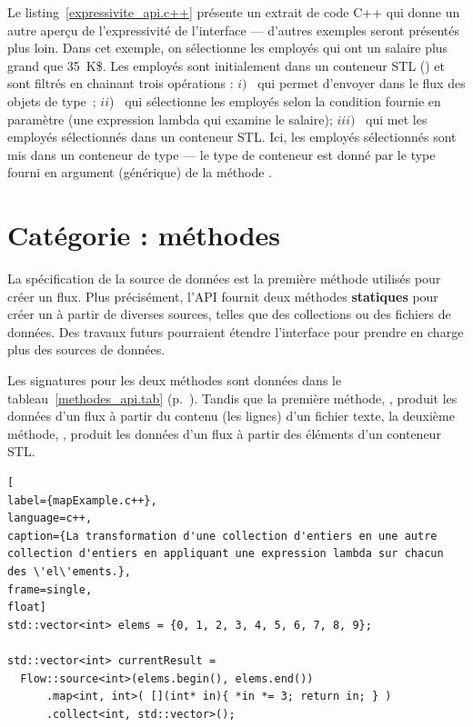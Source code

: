 Le listing~\ref{expressivite_api.c++} pr\'esente un extrait de code C++ qui donne un autre aper\c{c}u de l'expressivit\'e de l'interface --- d'autres exemples seront pr\'esent\'es plus loin. Dans cet exemple, on s\'electionne les employ\'es qui ont un salaire plus grand que 35~K\$. Les employ\'es sont initialement dans un conteneur STL () et sont filtr\'es en chainant trois op\'erations : $i)$~ qui permet d'envoyer dans le flux des objets de type~; $ii$)~ qui s\'electionne les employ\'es selon la condition fournie en param\`etre (une expression lambda qui examine le salaire); $iii)$~ qui met les employ\'es s\'electionn\'es dans un conteneur STL. Ici, les employ\'es s\'electionn\'es sont mis dans un conteneur de type  --- le type de conteneur est donn\'e par le type fourni en argument (g\'en\'erique) de la m\'ethode .
 





\section{Cat\'egorie  : m\'ethodes }

\label{source.sect}

La sp\'ecification de la source de donn\'ees est la premi\`ere m\'ethode utilis\'es pour cr\'eer un flux. 
%
%
Plus pr\'ecis\'ement, 
l'API fournit deux m\'ethodes {\bf statiques} pour cr\'eer un  \`a partir de diverses sources, telles que des collections ou des fichiers de donn\'ees. Des travaux futurs pourraient \'etendre l'interface pour prendre en charge plus des sources de donn\'ees.


Les signatures pour les deux m\'ethodes sont donn\'ees dans le tableau~\ref{methodes_api.tab} (p.~\pageref{source.page}). Tandis que la premi\`ere m\'ethode, , produit les donn\'ees d'un flux \`a partir du contenu (les lignes) d'un fichier texte, la deuxi\`eme m\'ethode, , produit les donn\'ees d'un flux \`a partir des \'el\'ements d'un conteneur STL.


\begin{lstlisting}[
label={mapExample.c++},
language=c++,
caption={La transformation d'une collection d'entiers en une autre collection d'entiers en appliquant une expression lambda sur chacun des \'el\'ements.},
frame=single,
float]
std::vector<int> elems = {0, 1, 2, 3, 4, 5, 6, 7, 8, 9};

std::vector<int> currentResult =
  Flow::source<int>(elems.begin(), elems.end())
      .map<int, int>( [](int* in){ *in *= 3; return in; } )
      .collect<int, std::vector>();            
\end{lstlisting}



